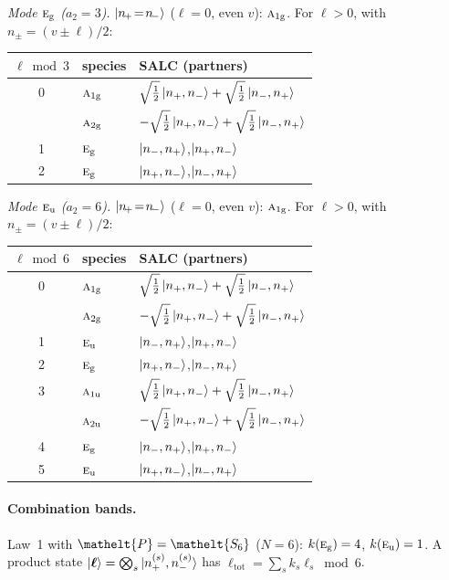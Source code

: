 \documentclass[11pt]{article}
\newcommand{\eltfont}[1]{{\let\sigma\eltsigma\mathelt{#1}}}
\newcommand{\irr}[1]{\text{\normalfont\scshape #1}}
\newcommand{\elt}[1]{\eltfont{#1}}
\newcommand{\ptag}[1]{\mathrm{#1}}
\newcommand{\pel}{\elt{P}}             %
\begin{document}
\emph{Mode $\irr{e}_{\ptag{g}}$ ($a_2=3$).} $\ket{n_{\!+}\!=\!n_{\!-}}$ ($\ell=0$, even $v$): $\irr{a}_{1\ptag{g}}$. For $\ell>0$, with $n_\pm=(v\pm\ell)/2$:
\begin{longtable}{c l l}\hline $\ell\bmod 3$ & species & SALC (partners)\\ \hline\endhead
0 & $\irr{a}_{1\ptag{g}}$ & $\sqrt{\tfrac{1}{2}}\ket{n_+,n_-}+\sqrt{\tfrac{1}{2}}\ket{n_-,n_+}$\\
 & $\irr{a}_{2\ptag{g}}$ & $-\sqrt{\tfrac{1}{2}}\ket{n_+,n_-}+\sqrt{\tfrac{1}{2}}\ket{n_-,n_+}$\\
1 & $\irr{e}_{\ptag{g}}$ & $\ket{n_-,n_+}$,\quad $\ket{n_+,n_-}$\\
2 & $\irr{e}_{\ptag{g}}$ & $\ket{n_+,n_-}$,\quad $\ket{n_-,n_+}$\\
\hline\end{longtable}

\emph{Mode $\irr{e}_{\ptag{u}}$ ($a_2=6$).} $\ket{n_{\!+}\!=\!n_{\!-}}$ ($\ell=0$, even $v$): $\irr{a}_{1\ptag{g}}$. For $\ell>0$, with $n_\pm=(v\pm\ell)/2$:
\begin{longtable}{c l l}\hline $\ell\bmod 6$ & species & SALC (partners)\\ \hline\endhead
0 & $\irr{a}_{1\ptag{g}}$ & $\sqrt{\tfrac{1}{2}}\ket{n_+,n_-}+\sqrt{\tfrac{1}{2}}\ket{n_-,n_+}$\\
 & $\irr{a}_{2\ptag{g}}$ & $-\sqrt{\tfrac{1}{2}}\ket{n_+,n_-}+\sqrt{\tfrac{1}{2}}\ket{n_-,n_+}$\\
1 & $\irr{e}_{\ptag{u}}$ & $\ket{n_-,n_+}$,\quad $\ket{n_+,n_-}$\\
2 & $\irr{e}_{\ptag{g}}$ & $\ket{n_+,n_-}$,\quad $\ket{n_-,n_+}$\\
3 & $\irr{a}_{1\ptag{u}}$ & $\sqrt{\tfrac{1}{2}}\ket{n_+,n_-}+\sqrt{\tfrac{1}{2}}\ket{n_-,n_+}$\\
 & $\irr{a}_{2\ptag{u}}$ & $-\sqrt{\tfrac{1}{2}}\ket{n_+,n_-}+\sqrt{\tfrac{1}{2}}\ket{n_-,n_+}$\\
4 & $\irr{e}_{\ptag{g}}$ & $\ket{n_-,n_+}$,\quad $\ket{n_+,n_-}$\\
5 & $\irr{e}_{\ptag{u}}$ & $\ket{n_+,n_-}$,\quad $\ket{n_-,n_+}$\\
\hline\end{longtable}

\paragraph{Combination bands.}

Law~1 with $\pel=\elt{S_{6}}$ ($N=6$): $k(\irr{e}_{\ptag{g}})=4$, $k(\irr{e}_{\ptag{u}})=1$. A product state $\ket{\boldsymbol\ell}=\bigotimes_s\ket{n_+^{(s)},n_-^{(s)}}$ has $\ell_{\mathrm{tot}}=\sum_sk_s\ell_s\bmod 6$.
\end{document}
